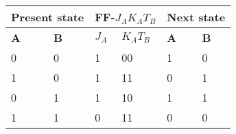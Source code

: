 \begin{tabular}{|l|l|l|l|l|l|}
\hline
  \multicolumn{2}{|c|}{\textbf{Present state}}&
  \multicolumn{2}{c}{\textbf{FF-$J_AK_AT_B$}}&
  \multicolumn{2}{|c|}{\textbf{Next state }}\\
  \hline
  \textbf{A}&\textbf{B}&\textbf{$J_A$}&\textbf{$K_AT_B$}&\textbf{A}&\textbf{B}\\
  \hline
  0&0&1&00&1&0\\
  \hline
  1&0&1&11&0&1\\
  \hline
  0&1&1&10&1&1\\
  \hline
  1&1&0&11&0&0\\
  \hline
\end{tabular}



